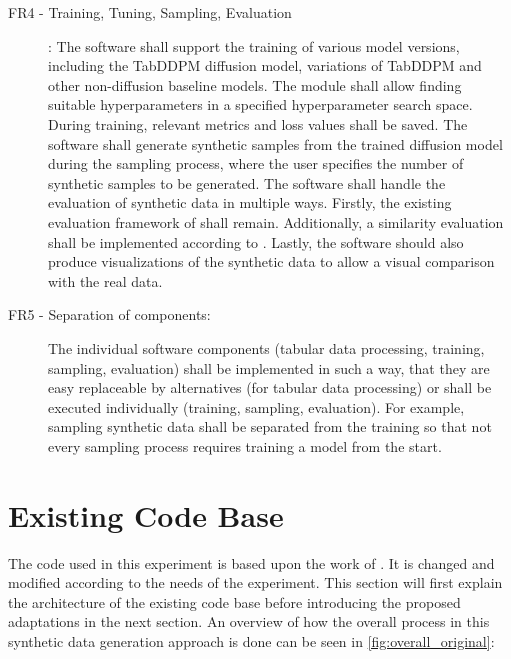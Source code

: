 \begin{description}
    \item[FR4 - Training, Tuning, Sampling, Evaluation]:
    The software shall support the training of various model versions, including the TabDDPM diffusion model, variations of TabDDPM and other non-diffusion baseline models.
    The module shall allow finding suitable hyperparameters in a specified hyperparameter search space.
    During training, relevant metrics and loss values shall be saved.
    The software shall generate synthetic samples from the trained diffusion model during the sampling process, where the user specifies the number of synthetic samples to be generated.
    The software shall handle the evaluation of synthetic data in multiple ways.
    Firstly, the existing evaluation framework of \cite{kotelnikov2022TabDDPMModellingTabular} shall remain.
    Additionally, a similarity evaluation shall be implemented according to \cite{chundawat2022UniversalMetricRobust}.
    Lastly, the software should also produce visualizations of the synthetic data to allow a visual comparison with the real data.
    
    \item[FR5 - Separation of components:]
    The individual software components (tabular data processing, training, sampling, evaluation) shall be implemented in such a way,
    that they are easy replaceable by alternatives (for tabular data processing) or shall be executed individually (training, sampling, evaluation).
    For example, sampling synthetic data shall be separated from the training so that not every sampling process requires training a model from the start. 
\end{description}


\section{Existing Code Base}
\label{ch:conceptualDesign-existingCodeBase}

The code \cite{akim2023TabDDPMModellingTabular} used in this experiment is based upon the work of \cite{kotelnikov2022TabDDPMModellingTabular}.
It is changed and modified according to the needs of the experiment. 
This section will first explain the architecture of the existing code base before introducing the proposed adaptations in the next section.
An overview of how the overall process in this synthetic data generation approach is done can be seen in \autoref{fig:overall_original}:


